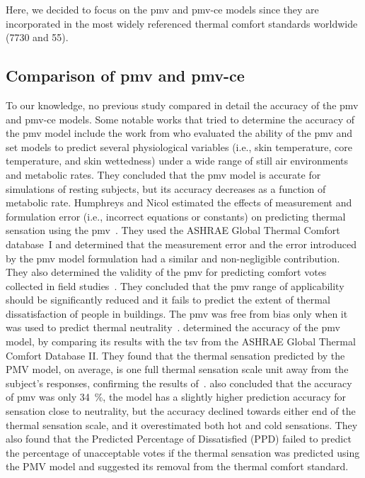 Here, we decided to focus on the \ac{pmv} and \ac{pmv-ce} models since they are incorporated in the most widely referenced thermal comfort standards worldwide (\gls{7730} and \gls{55}).

\subsection{Comparison of \ac{pmv} and \ac{pmv-ce}}\label{subsec:comparision-of-pmv-formulations}
To our knowledge, no previous study compared in detail the accuracy of the \ac{pmv} and \ac{pmv-ce} models.
Some notable works that tried to determine the accuracy of the \ac{pmv} model include the work from  who evaluated the ability of the \ac{pmv} and \ac{set} models to predict several physiological variables (i.e., skin temperature, core temperature, and skin wettedness) under a wide range of still air environments and metabolic rates.
They concluded that the \ac{pmv} model is accurate for simulations of resting subjects, but its accuracy decreases as a function of metabolic rate.
Humphreys and Nicol estimated the effects of measurement and formulation error (i.e., incorrect equations or constants) on predicting thermal sensation using the \ac{pmv}~\cite{Humphreys2000}.
They used the ASHRAE Global Thermal Comfort database~I and determined that the measurement error and the error introduced by the \ac{pmv} model formulation had a similar and non-negligible contribution.
They also determined the validity of the \ac{pmv} for predicting comfort votes collected in field studies~\cite{Humphreys2002}.
They concluded that the \ac{pmv} range of applicability should be significantly reduced and it fails to predict the extent of thermal dissatisfaction of people in buildings.
The \ac{pmv} was free from bias only when it was used to predict thermal neutrality~\cite{Humphreys2002}.
 determined the accuracy of the \ac{pmv} model, by comparing its results with the \ac{tsv} from the ASHRAE Global Thermal Comfort Database II.
They found that the thermal sensation predicted by the PMV model, on average, is one full thermal sensation scale unit away from the subject’s responses, confirming the results of~.
 also concluded that the accuracy of \ac{pmv} was only \qty{34}{\percent}, the model has a slightly higher prediction accuracy for sensation close to neutrality, but the accuracy declined towards either end of the thermal sensation scale, and it overestimated both hot and cold sensations.
They also found that the Predicted Percentage of Dissatisfied (PPD) failed to predict the percentage of unacceptable votes if the thermal sensation was predicted using the PMV model and suggested its removal from the thermal comfort standard.
